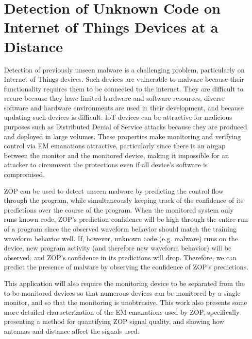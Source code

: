 \section{Detection of Unknown Code on Internet of Things Devices at a Distance}

Detection of previously unseen malware is a challenging problem, particularly on Internet of Things devices. Such devices are vulnerable to malware because their functionality requires them to be connected to the internet. They are difficult to secure because they have limited hardware and software resources, diverse software and hardware environments are used in their development, and because updating such devices is difficult. IoT devices can be attractive for malicious purposes such as Distributed Denial of Service attacks because they are produced and deployed in large volumes. These properties make monitoring and verifying control via EM emanations attractive, particularly since there is an airgap between the monitor and the monitored device, making it impossible for an attacker to circumvent the protections even if all device's software is compromised. 

ZOP can be used to detect unseen malware by predicting the control flow through the program, while simultaneously keeping track of the confidence of its predictions over the course of the program. When the monitored system only runs known code, ZOP's prediction confidence will be high through the entire run of a program since the observed waveform behavior should match the training waveform behavior well. If, however, unknown code (e.g. malware) runs on the device, new program activity (and therefore new waveform behavior) will be observed, and ZOP's confidence in its predictions will drop. Therefore, we can predict the presence of malware by observing the confidence of ZOP's predictions.

This application will also require the monitoring device to be separated from the to-be-monitored devices so that numerous devices can be monitored by a single monitor, and so that the monitoring is unobtrusive. This work also presents some more detailed characterization of the EM emanations used by ZOP, specifically presenting a method for quantifying ZOP signal quality, and showing how antennas and distance affect the signals used.

